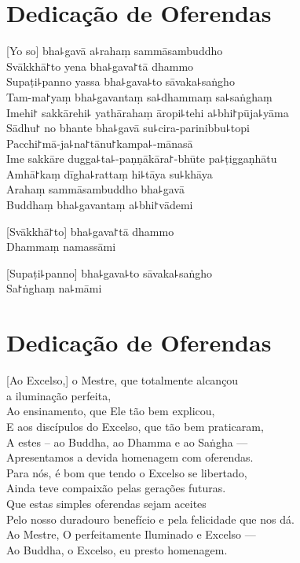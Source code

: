 \chapter*{Dedicação de Oferendas}

\delegateSetUseNext

[Yo so] bha꜕gavā a꜕rahaṃ sammāsambuddho\\
Svākkhā꜓to yena bha꜕gava꜓tā dhammo\\
Supaṭi꜕panno yassa bha꜕gava꜕to sāvaka꜕saṅgho\\
Tam-ma꜓yaṃ bha꜕gavantaṃ sa꜕dhammaṃ sa꜕saṅghaṃ\\
Imehi꜓ sakkārehi꜕ yathārahaṃ āropi꜕tehi a꜕bhi꜓pūja꜕yāma\\
Sādhu꜓ no bhante bha꜕gavā su꜕cira-parinibbu꜕topi\\
Pacchi꜓mā-ja꜕na꜓tānu꜓kampa꜕-mānasā\\
Ime sakkāre dugga꜕ta꜕-paṇṇākāra꜓-bhūte pa꜕ṭiggaṇhātu\\
Amhā꜓kaṃ dīgha꜕rattaṃ hi꜕tāya su꜕khāya\\
Arahaṃ sammāsambuddho bha꜕gavā\\
Buddhaṃ bha꜕gavantaṃ a꜕bhi꜓vādemi 

[Svākkhā꜓to] bha꜕gava꜓tā dhammo\\
Dhammaṃ namassāmi 

[Supaṭi꜕panno] bha꜕gava꜕to sāvaka꜕saṅgho\\
Sa꜓ṅghaṃ na꜕māmi 

\clearpage

\chapter{Dedicação de Oferendas}

[Ao Excelso,] o Mestre, que totalmente alcançou\\
\vin a iluminação perfeita,\\
Ao ensinamento, que Ele tão bem explicou,\\
E aos discípulos do Excelso, que tão bem praticaram,\\
A estes – ao Buddha, ao Dhamma e ao Saṅgha ---\\
Apresentamos a devida homenagem com oferendas.\\
Para nós, é bom que tendo o Excelso se libertado,\\
Ainda teve compaixão pelas gerações futuras.\\
Que estas simples oferendas sejam aceites\\
Pelo nosso duradouro benefício e pela felicidade que nos dá.\\
Ao Mestre, O perfeitamente Iluminado e Excelso ---\\
Ao Buddha, o Excelso, eu presto homenagem. 

